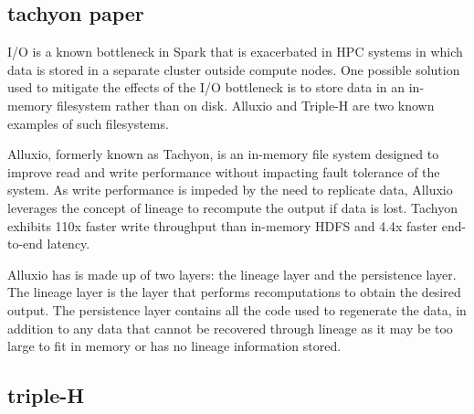 \documentclass{report}
\begin{document}
    \subsection{tachyon paper} I/O is a known bottleneck in Spark that is
    exacerbated in HPC systems in which data is stored in a separate cluster
    outside compute nodes. One possible solution used to mitigate the effects of
    the I/O bottleneck is to store data in an in-memory filesystem rather than
    on disk.  Alluxio and Triple-H are two known examples of such filesystems.
	
    Alluxio, formerly known as Tachyon, is an in-memory file system designed to
    improve read and write performance without impacting fault tolerance of the
    system. As write performance is impeded by the need to replicate data,
    Alluxio leverages the concept of lineage to recompute the output if data is
    lost.  Tachyon exhibits 110x faster write throughput than in-memory HDFS and
    4.4x faster end-to-end latency. 

    Alluxio has is made up of two layers: the lineage layer and the persistence
    layer. The lineage layer is the layer that performs recomputations to obtain
    the desired output. The persistence layer contains all the code used to
    regenerate the data, in addition to any data that cannot be recovered
    through lineage as it may be too large to fit in memory or has no lineage
    information stored.
	
    \subsection{triple-H}
	
	
	
	
	
	
	
	
	
	
	
	
	
	
	
	
\end{document}
